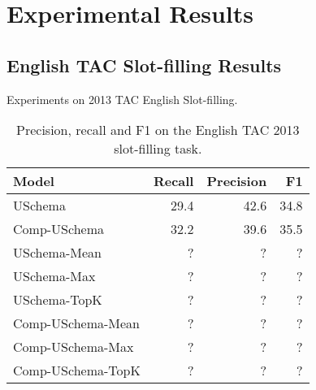 \section{Experimental Results\label{sec:results}}


\subsection {English TAC Slot-filling Results}
Experiments on 2013 TAC English Slot-filling.


\begin{table}[h!]
\setlength{\tabcolsep}{4.1pt}
\begin{center}
\begin{tabular}{|lrrr|}
\hline
\bf Model & \bf Recall & \bf Precision & \bf F1 \\
\hline\hline
USchema             & 29.4 & 42.6 & 34.8 \\
Comp-USchema                & 32.2 & 39.6 & 35.5  \\
\hline\hline
USchema-Mean        & ? & ? & ? \\
USchema-Max        & ? & ? & ? \\
USchema-TopK        & ? & ? & ? \\
Comp-USchema-Mean        & ? & ? & ? \\
Comp-USchema-Max        & ? & ? & ? \\
Comp-USchema-TopK        & ? & ? & ? \\
\hline\hline

\hline
\end{tabular}
\caption{Precision, recall and F1 on the English TAC 2013 slot-filling task.
\label{en-tac-table}}
\end{center}
\vspace{-.3cm}
\end{table}
